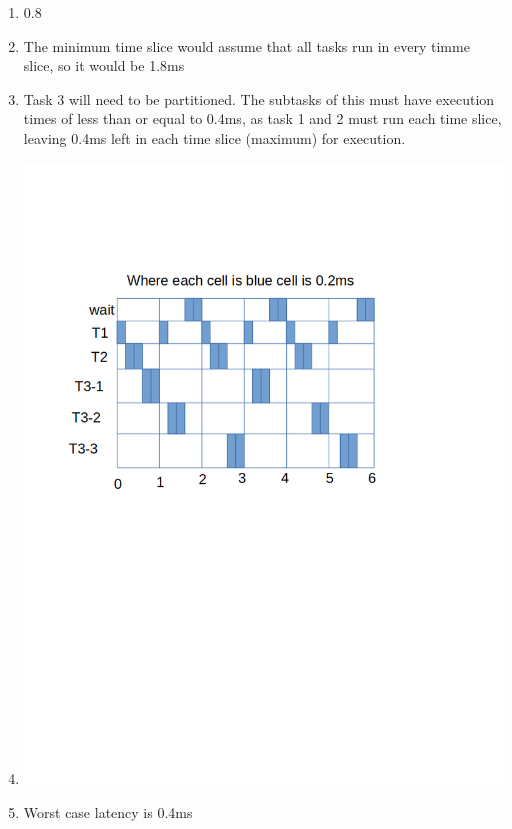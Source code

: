 \documentclass{jhwhw}
\begin{document}
\problem{}
\begin{enumerate}
\item $0.8$
\item The minimum time slice would assume that all tasks run in every timme slice, so it would be 1.8ms
\item Task 3 will need to be partitioned. The subtasks of this must have execution times of less than or equal to 0.4ms, as task 1 and 2 must run each time slice, leaving 0.4ms left in each time slice (maximum) for execution.
\item 
\includegraphics[scale=0.50]{HW2-2.png}
\item Worst case latency is 0.4ms
\end{enumerate}
\end{document}
